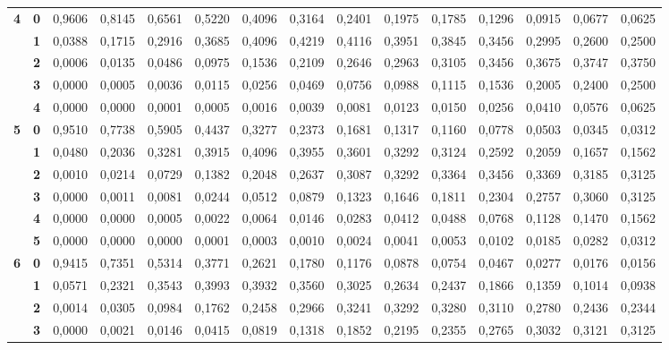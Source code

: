 \documentclass[11pt,a4paper]{article}
\begin{document}
\begin{center}
\begin{tabular}{cc|ccccccccccccc}
\midrule
\multirow{5}{*}{\textbf{4}} & \textbf{0} & 0,9606 & 0,8145 & 0,6561 & 0,5220 & 0,4096 & 0,3164 & 0,2401 & 0,1975 & 0,1785 & 0,1296 & 0,0915 & 0,0677 & 0,0625\\
 & \textbf{1} & 0,0388 & 0,1715 & 0,2916 & 0,3685 & 0,4096 & 0,4219 & 0,4116 & 0,3951 & 0,3845 & 0,3456 & 0,2995 & 0,2600 & 0,2500\\
 & \textbf{2} & 0,0006 & 0,0135 & 0,0486 & 0,0975 & 0,1536 & 0,2109 & 0,2646 & 0,2963 & 0,3105 & 0,3456 & 0,3675 & 0,3747 & 0,3750\\
 & \textbf{3} & 0,0000 & 0,0005 & 0,0036 & 0,0115 & 0,0256 & 0,0469 & 0,0756 & 0,0988 & 0,1115 & 0,1536 & 0,2005 & 0,2400 & 0,2500\\
 & \textbf{4} & 0,0000 & 0,0000 & 0,0001 & 0,0005 & 0,0016 & 0,0039 & 0,0081 & 0,0123 & 0,0150 & 0,0256 & 0,0410 & 0,0576 & 0,0625\\
\midrule
\multirow{6}{*}{\textbf{5}} & \textbf{0} & 0,9510 & 0,7738 & 0,5905 & 0,4437 & 0,3277 & 0,2373 & 0,1681 & 0,1317 & 0,1160 & 0,0778 & 0,0503 & 0,0345 & 0,0312\\
 & \textbf{1} & 0,0480 & 0,2036 & 0,3281 & 0,3915 & 0,4096 & 0,3955 & 0,3601 & 0,3292 & 0,3124 & 0,2592 & 0,2059 & 0,1657 & 0,1562\\
 & \textbf{2} & 0,0010 & 0,0214 & 0,0729 & 0,1382 & 0,2048 & 0,2637 & 0,3087 & 0,3292 & 0,3364 & 0,3456 & 0,3369 & 0,3185 & 0,3125\\
 & \textbf{3} & 0,0000 & 0,0011 & 0,0081 & 0,0244 & 0,0512 & 0,0879 & 0,1323 & 0,1646 & 0,1811 & 0,2304 & 0,2757 & 0,3060 & 0,3125\\
 & \textbf{4} & 0,0000 & 0,0000 & 0,0005 & 0,0022 & 0,0064 & 0,0146 & 0,0283 & 0,0412 & 0,0488 & 0,0768 & 0,1128 & 0,1470 & 0,1562\\
 & \textbf{5} & 0,0000 & 0,0000 & 0,0000 & 0,0001 & 0,0003 & 0,0010 & 0,0024 & 0,0041 & 0,0053 & 0,0102 & 0,0185 & 0,0282 & 0,0312\\
\midrule
\multirow{7}{*}{\textbf{6}} & \textbf{0} & 0,9415 & 0,7351 & 0,5314 & 0,3771 & 0,2621 & 0,1780 & 0,1176 & 0,0878 & 0,0754 & 0,0467 & 0,0277 & 0,0176 & 0,0156\\
 & \textbf{1} & 0,0571 & 0,2321 & 0,3543 & 0,3993 & 0,3932 & 0,3560 & 0,3025 & 0,2634 & 0,2437 & 0,1866 & 0,1359 & 0,1014 & 0,0938\\
 & \textbf{2} & 0,0014 & 0,0305 & 0,0984 & 0,1762 & 0,2458 & 0,2966 & 0,3241 & 0,3292 & 0,3280 & 0,3110 & 0,2780 & 0,2436 & 0,2344\\
 & \textbf{3} & 0,0000 & 0,0021 & 0,0146 & 0,0415 & 0,0819 & 0,1318 & 0,1852 & 0,2195 & 0,2355 & 0,2765 & 0,3032 & 0,3121 & 0,3125\\

\end{tabular}
\end{center}
\end{document}
